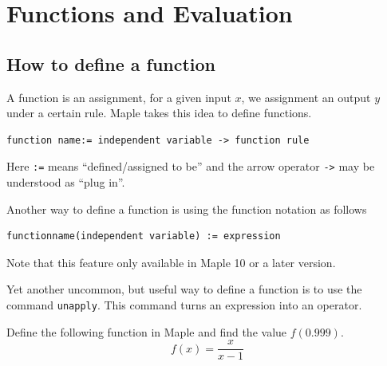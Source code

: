 \documentclass[
  12pt]{elegantbook}
\begin{document}
\hypertarget{functions-and-evaluation}{%
\section{Functions and Evaluation}\label{functions-and-evaluation}}

\hypertarget{how-to-define-a-function}{%
\subsection{How to define a function}\label{how-to-define-a-function}}

A function is an assignment, for a given input \(x\), we assignment an output \(y\) under a certain rule. Maple takes this idea to define functions.

\begin{verbatim}
function name:= independent variable -> function rule
\end{verbatim}

Here \texttt{:=} means ``defined/assigned to be'' and the arrow operator \texttt{-\textgreater{}} may be understood as ``plug in''.

Another way to define a function is using the function notation as follows

\begin{verbatim}
functionname(independent variable) := expression
\end{verbatim}

Note that this feature only available in Maple 10 or a later version.

Yet another uncommon, but useful way to define a function is to use the command \texttt{unapply}. This command turns an expression into an operator.

\begin{example}
Define the following function in Maple and find the value \(f(0.999)\).
\[f(x)=\dfrac{x}{x-1}\]
\end{example}
\end{document}
